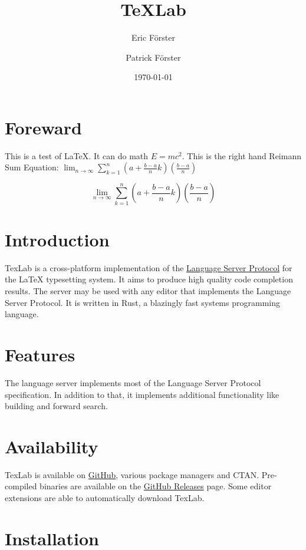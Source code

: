 \documentclass{article}
\date{\today}
\author{Eric Förster \and Patrick Förster}
\title{\TeX{}Lab}
\begin{document}
\maketitle{}

\section{Foreward}
This is a test of \LaTeX. It can do math $E=mc^2$. This is the right hand Reimann Sum Equation: $\lim_{n\to\infty} \sum_{k=1}^{n}(a+\frac{b - a}{n}k)(\frac{b-a}{n})$

\[ \lim_{n\to\infty} \sum_{k=1}^{n} (a + \frac{b - a}{n} k) (\frac{b - a}{n}) \]

\section{Introduction}

TexLab is a cross-platform implementation of the
\href{https://microsoft.github.io/language-server-protocol/specifications/specification-current/}{Language Server Protocol}
for the \LaTeX{} typesetting system.
It aims to produce high quality code completion results.
The server may be used with any editor that implements the Language Server Protocol.
It is written in Rust, a blazingly fast systems programming language.

\section{Features}

The language server implements most of the Language Server Protocol specification.
In addition to that, it implements additional functionality like
building and forward search.

\section{Availability}

TexLab is available on \href{https://github.com/latex-lsp/texlab}{GitHub},
various package managers and CTAN\@. 
Pre-compiled binaries are available on the 
\href{https://github.com/latex-lsp/texlab/releases}{GitHub Releases} page.
Some editor extensions are able to automatically download TexLab.

\section{Installation}
\end{document}
